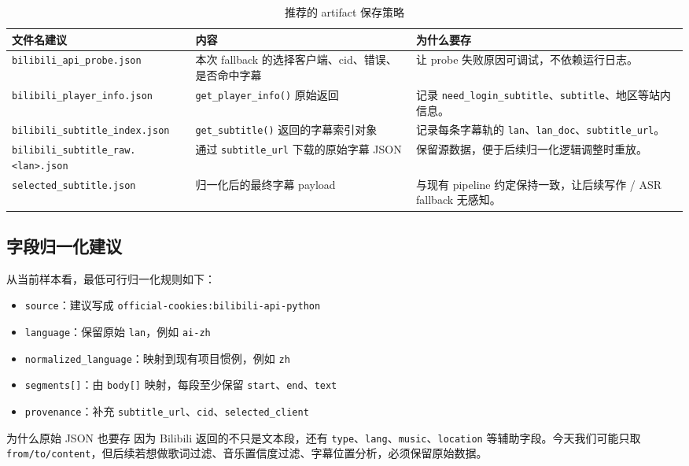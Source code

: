 \documentclass[a4paper]{article}
\begin{document}
\begin{table}[H]
\centering
\begin{tabularx}{\textwidth}{p{4.3cm}p{3.5cm}Y}
\toprule
文件名建议 & 内容 & 为什么要存 \\
\midrule
\texttt{bilibili\_api\_probe.json} & 本次 fallback 的选择客户端、cid、错误、是否命中字幕 & 让 probe 失败原因可调试，不依赖运行日志。 \\
\texttt{bilibili\_player\_info.json} & \texttt{get\_player\_info()} 原始返回 & 记录 \texttt{need\_login\_subtitle}、\texttt{subtitle}、地区等站内信息。 \\
\texttt{bilibili\_subtitle\_index.json} & \texttt{get\_subtitle()} 返回的字幕索引对象 & 记录每条字幕轨的 \texttt{lan}、\texttt{lan\_doc}、\texttt{subtitle\_url}。 \\
\texttt{bilibili\_subtitle\_raw.<lan>.json} & 通过 \texttt{subtitle\_url} 下载的原始字幕 JSON & 保留源数据，便于后续归一化逻辑调整时重放。 \\
\texttt{selected\_subtitle.json} & 归一化后的最终字幕 payload & 与现有 pipeline 约定保持一致，让后续写作 / ASR fallback 无感知。 \\
\bottomrule
\end{tabularx}
\caption{推荐的 artifact 保存策略}
\end{table}

\subsection{字段归一化建议}

从当前样本看，最低可行归一化规则如下：
\begin{itemize}
\item \texttt{source}：建议写成 \texttt{official-cookies:bilibili-api-python}
\item \texttt{language}：保留原始 \texttt{lan}，例如 \texttt{ai-zh}
\item \texttt{normalized\_language}：映射到现有项目惯例，例如 \texttt{zh}
\item \texttt{segments[]}：由 \texttt{body[]} 映射，每段至少保留 \texttt{start}、\texttt{end}、\texttt{text}
\item \texttt{provenance}：补充 \texttt{subtitle\_url}、\texttt{cid}、\texttt{selected\_client}
\end{itemize}

\begin{evidencebox}{为什么原始 JSON 也要存}
因为 Bilibili 返回的不只是文本段，还有 \texttt{type}、\texttt{lang}、\texttt{music}、\texttt{location} 等辅助字段。今天我们可能只取 \texttt{from/to/content}，但后续若想做歌词过滤、音乐置信度过滤、字幕位置分析，必须保留原始数据。
\end{evidencebox}
\end{document}
